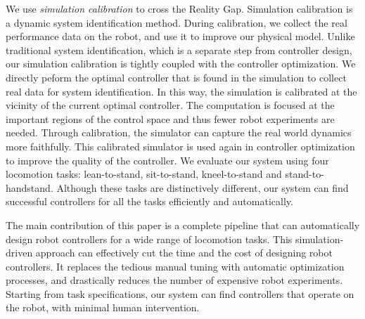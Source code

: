 We use \emph{simulation calibration} to cross the Reality Gap. Simulation calibration is a dynamic system identification method. During calibration, we collect the real performance data on the robot, and use it to improve our physical model. Unlike traditional system identification, which is a separate step from controller design, our simulation calibration is tightly coupled with the controller optimization. We directly peform the optimal controller that is found in the simulation to collect real data for system identification. In this way, the simulation is calibrated at the vicinity of the current optimal controller. The computation is focused at the important regions of the control space and thus fewer robot experiments are needed. Through calibration, the simulator can capture the real world dynamics more faithfully. This calibrated simulator is used again in controller optimization to improve the quality of the controller. We evaluate our system using four locomotion tasks: lean-to-stand, sit-to-stand, kneel-to-stand and stand-to-handstand. Although these tasks are distinctively different, our system can find successful controllers for all the tasks efficiently and automatically. 

The main contribution of this paper is a complete pipeline that can automatically design robot controllers for a wide range of locomotion tasks. This simulation-driven approach can effectively cut the time and the cost of designing robot controllers. It replaces the tedious manual tuning with automatic optimization processes, and drastically reduces the number of expensive robot experiments. Starting from task specifications, our system can find controllers that operate on the robot, with minimal human intervention. 

